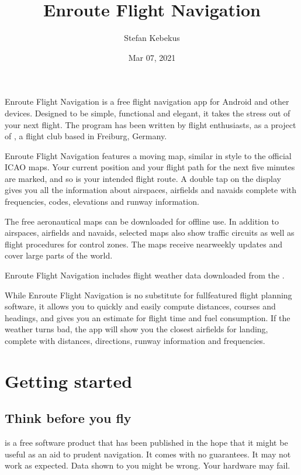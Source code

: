 \documentclass[letterpaper,10pt,english]{sphinxmanual}
\title{Enroute Flight Navigation}
\date{Mar 07, 2021}
\author{Stefan Kebekus}
\let\sphinxpxdimen\pdfpxdimen\else\newdimen\sphinxpxdimen
\begin{document}
\pagestyle{empty}
\sphinxmaketitle
\pagestyle{plain}
\sphinxtableofcontents
\pagestyle{normal}
\label{\detokenize{index::doc}}


\noindent{\hspace*{\fill}\sphinxincludegraphics[width=100\sphinxpxdimen]{{de.akaflieg_freiburg.enroute}.png}\hspace*{\fill}}

\sphinxAtStartPar
Enroute Flight Navigation is a free flight navigation app for Android and other
devices. Designed to be simple, functional and elegant, it takes the stress out
of your next flight. The program has been written by flight enthusiasts, as a
project of , a flight club
based in Freiburg, Germany.

\sphinxAtStartPar
Enroute Flight Navigation features a moving map, similar in style to the
official ICAO maps. Your current position and your flight path for the next five
minutes are marked, and so is your intended flight route. A double tap on the
display gives you all the information about airspaces, airfields and navaids \textendash{}
complete with frequencies, codes, elevations and runway information.

\sphinxAtStartPar
The free aeronautical maps can be downloaded for offline use. In addition to
airspaces, airfields and navaids, selected maps also show traffic circuits as
well as flight procedures for control zones. The maps receive near\sphinxhyphen{}weekly
updates and cover large parts of the world.

\sphinxAtStartPar
Enroute Flight Navigation includes flight weather data downloaded from the
.

\sphinxAtStartPar
While Enroute Flight Navigation is no substitute for full\sphinxhyphen{}featured flight
planning software, it allows you to quickly and easily compute distances,
courses and headings, and gives you an estimate for flight time and fuel
consumption. If the weather turns bad, the app will show you the closest
airfields for landing, complete with distances, directions, runway information
and frequencies.

\part{Getting started}


\chapter{Think before you fly}
\label{\detokenize{01-intro/think:think-before-you-fly}}\label{\detokenize{01-intro/think::doc}}
\sphinxAtStartPar
{} is a free software product that has been published
in the hope that it might be useful as an aid to prudent navigation.  It comes
with no guarantees.  It may not work as expected.  Data shown to you might be
wrong.  Your hardware may fail.
\end{document}
